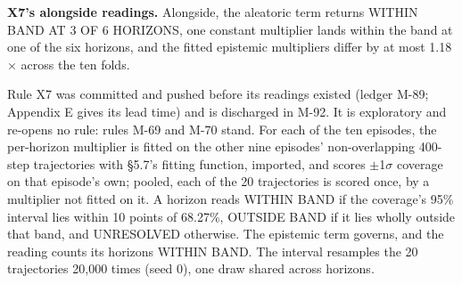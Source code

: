 \documentclass[10pt]{article}
\begin{document}
\textbf{X7's alongside readings.} Alongside, the aleatoric term returns WITHIN BAND AT 3 OF 6 HORIZONS, one constant multiplier lands within the band at one of the six horizons, and the fitted epistemic multipliers differ by at most 1.18$\times$ across the ten folds.

Rule X7 was committed and pushed before its readings existed (ledger M-89; Appendix E gives its lead time) and is discharged in M-92. It is exploratory and re-opens no rule: rules M-69 and M-70 stand. For each of the ten episodes, the per-horizon multiplier is fitted on the other nine episodes' non-overlapping 400-step trajectories with \S{}5.7's fitting function, imported, and scores $\pm$1$\sigma$ coverage on that episode's own; pooled, each of the 20 trajectories is scored once, by a multiplier not fitted on it. A horizon reads WITHIN BAND if the coverage's 95\% interval lies within 10 points of 68.27\%, OUTSIDE BAND if it lies wholly outside that band, and UNRESOLVED otherwise. The epistemic term governs, and the reading counts its horizons WITHIN BAND. The interval resamples the 20 trajectories 20,000 times (seed 0), one draw shared across horizons.
\end{document}
